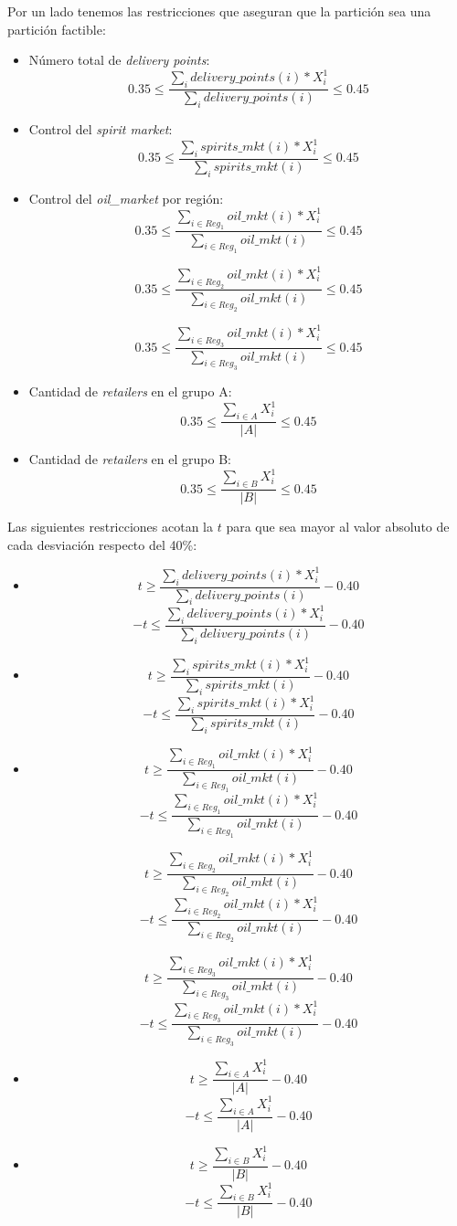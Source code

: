 Por un lado tenemos las restricciones que aseguran que la partición sea una partición factible:
\begin{itemize}
    \item Número total de \emph{delivery points}:
    $$ 0.35 \leq \frac{\sum_i delivery\_points(i)*X^1_i}{\sum_i delivery\_points(i)} \leq 0.45 $$
    \item Control del \emph{spirit market}:
    $$ 0.35 \leq \frac{\sum_i spirits\_mkt(i)*X^1_i}{\sum_i spirits\_mkt(i)} \leq 0.45 $$
    \item Control del \emph{oil_market} por región:
    $$ 0.35 \leq \frac{\sum_{i\in Reg_1} oil\_mkt(i)*X^1_i}{\sum_{i\in Reg_1} oil\_mkt(i)} \leq 0.45 $$

    $$ 0.35 \leq \frac{\sum_{i\in Reg_2} oil\_mkt(i)*X^1_i}{\sum_{i\in Reg_2} oil\_mkt(i)} \leq 0.45 $$

    $$ 0.35 \leq \frac{\sum_{i\in Reg_3} oil\_mkt(i)*X^1_i}{\sum_{i\in Reg_3} oil\_mkt(i)} \leq 0.45 $$
    \item Cantidad de \emph{retailers} en el grupo A:
    $$ 0.35 \leq \frac{\sum_{i\in A} X^1_i}{ |A| }  \leq 0.45 $$
    \item Cantidad de \emph{retailers} en el grupo B:
    $$ 0.35 \leq \frac{\sum_{i\in B} X^1_i}{ |B| } \leq 0.45 $$
\end{itemize}

Las siguientes restricciones acotan la $t$ para que sea mayor al valor absoluto de cada desviación respecto del 40\%:

\begin{itemize}
    \item
    $$ t  \geq \frac{\sum_i delivery\_points(i)*X^1_i}{\sum_i delivery\_points(i)} - 0.40 $$
    $$ -t  \leq \frac{\sum_i delivery\_points(i)*X^1_i}{\sum_i delivery\_points(i)} - 0.40 $$
    \item
    $$ t \geq \frac{\sum_i spirits\_mkt(i)*X^1_i}{\sum_i spirits\_mkt(i)} - 0.40 $$
    $$ -t \leq \frac{\sum_i spirits\_mkt(i)*X^1_i}{\sum_i spirits\_mkt(i)} - 0.40 $$
    \item
    $$ t \geq \frac{\sum_{i\in Reg_1} oil\_mkt(i)*X^1_i}{\sum_{i\in Reg_1} oil\_mkt(i)} - 0.40 $$
    $$ -t \leq \frac{\sum_{i\in Reg_1} oil\_mkt(i)*X^1_i}{\sum_{i\in Reg_1} oil\_mkt(i)} - 0.40 $$

    $$ t \geq \frac{\sum_{i\in Reg_2} oil\_mkt(i)*X^1_i}{\sum_{i\in Reg_2} oil\_mkt(i)} - 0.40 $$
    $$ -t \leq \frac{\sum_{i\in Reg_2} oil\_mkt(i)*X^1_i}{\sum_{i\in Reg_2} oil\_mkt(i)} - 0.40 $$

    $$ t \geq \frac{\sum_{i\in Reg_3} oil\_mkt(i)*X^1_i}{\sum_{i\in Reg_3} oil\_mkt(i)} - 0.40 $$
    $$ -t \leq \frac{\sum_{i\in Reg_3} oil\_mkt(i)*X^1_i}{\sum_{i\in Reg_3} oil\_mkt(i)} - 0.40 $$
    \item
    $$ t \geq \frac{\sum_{i\in A} X^1_i}{ |A| } - 0.40 $$
    $$ -t \leq \frac{\sum_{i\in A} X^1_i}{ |A| } - 0.40 $$
    \item
    $$ t \geq \frac{\sum_{i\in B} X^1_i}{ |B| } - 0.40 $$
    $$ -t \leq \frac{\sum_{i\in B} X^1_i}{ |B| } - 0.40 $$
\end{itemize}


